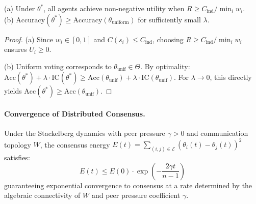 \begin{theorem}
\label{thm:ir}
(a) Under $\theta^*$, all agents achieve non-negative utility when $R \geq C_{\text{ind}} / \min_i w_i$. \\
(b) $\text{Accuracy}(\theta^*) \geq \text{Accuracy}(\theta_{\text{uniform}})$ for sufficiently small $\lambda$.
\end{theorem}

\begin{proof}
(a) Since $w_i \in [0,1]$ and $C(s_i) \leq C_{\text{ind}}$, choosing $R \geq C_{\text{ind}} / \min_i w_i$ ensures $U_i \geq 0$.

(b) Uniform voting corresponds to $\theta_{\text{unif}} \in \Theta$. By optimality: $\text{Acc}(\theta^*) + \lambda \cdot \text{IC}(\theta^*) \geq \text{Acc}(\theta_{\text{unif}}) + \lambda \cdot \text{IC}(\theta_{\text{unif}})$. For $\lambda \to 0$, this directly yields $\text{Acc}(\theta^*) \geq \text{Acc}(\theta_{\text{unif}})$.
\end{proof}

\paragraph{Convergence of Distributed Consensus.}
Under the Stackelberg dynamics with peer pressure $\gamma > 0$ and communication topology $W$, the consensus energy $E(t) = \sum_{(i,j) \in \mathcal{E}} (\theta_i(t) - \theta_j(t))^2$ satisfies:
\begin{equation}
    E(t) \leq E(0) \cdot \exp\!\left(-\frac{2\gamma t}{n-1}\right)
\end{equation}
guaranteeing exponential convergence to consensus at a rate determined by the algebraic connectivity of $W$ and peer pressure coefficient $\gamma$.
